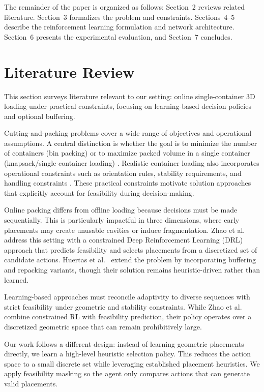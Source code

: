 \documentclass[runningheads]{llncs}
\begin{document}
The remainder of the paper is organized as follows: Section~2 reviews related literature. Section~3 formalizes the problem and constraints. Sections~4--5 describe the reinforcement learning formulation and network architecture. Section~6 presents the experimental evaluation, and Section~7 concludes.

\section{Literature Review}
\label{sec:literature}
This section surveys literature relevant to our setting: online single-container 3D loading under practical constraints, focusing on learning-based decision policies and optional buffering.

Cutting-and-packing problems cover a wide range of objectives and operational assumptions. A central distinction is whether the goal is to minimize the number of containers (bin packing) or to maximize packed volume in a single container (knapsack/single-container loading) \cite{Wascher2007}. Realistic container loading also incorporates operational constraints such as orientation rules, stability requirements, and handling constraints \cite{BortfeldtWascher2013Constraints}. These practical constraints motivate solution approaches that explicitly account for feasibility during decision-making.

Online packing differs from offline loading because decisions must be made sequentially. This is particularly impactful in three dimensions, where early placements may create unusable cavities or induce fragmentation. Zhao et al.~\cite{zhao} address this setting with a constrained Deep Reinforcement Learning (DRL) approach that predicts feasibility and selects placements from a discretized set of candidate actions. Huertas et al.~\cite{david} extend the problem by incorporating buffering and repacking variants, though their solution remains heuristic-driven rather than learned.

Learning-based approaches must reconcile adaptivity to diverse sequences with strict feasibility under geometric and stability constraints. While Zhao et al.~\cite{zhao} combine constrained RL with feasibility prediction, their policy operates over a discretized geometric space that can remain prohibitively large.

Our work follows a different design: instead of learning geometric placements directly, we learn a high-level heuristic selection policy. This reduces the action space to a small discrete set while leveraging established placement heuristics. We apply feasibility masking so the agent only compares actions that can generate valid placements.
\end{document}
